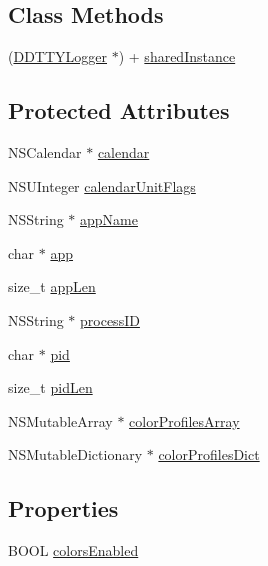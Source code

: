 \subsection*{Class Methods}
\begin{DoxyCompactItemize}
\item 
(\hyperlink{interface_d_d_t_t_y_logger}{D\-D\-T\-T\-Y\-Logger} $\ast$) + \hyperlink{interface_d_d_t_t_y_logger_abcb0224cccf6a4515ae22f1c79c0c9d5}{shared\-Instance}
\end{DoxyCompactItemize}
\subsection*{Protected Attributes}
\begin{DoxyCompactItemize}
\item 
N\-S\-Calendar $\ast$ \hyperlink{interface_d_d_t_t_y_logger_a4ee6e8d3042ae5d175a768a4e5c53c09}{calendar}
\item 
N\-S\-U\-Integer \hyperlink{interface_d_d_t_t_y_logger_a056843aff6a644ca5cec90806bccd3b4}{calendar\-Unit\-Flags}
\item 
N\-S\-String $\ast$ \hyperlink{interface_d_d_t_t_y_logger_a9f54836505cd04fe3205fc4b0419fd4d}{app\-Name}
\item 
char $\ast$ \hyperlink{interface_d_d_t_t_y_logger_aea8969e6e0fc04b775c1212139c669ea}{app}
\item 
size\-\_\-t \hyperlink{interface_d_d_t_t_y_logger_a1f9410c4ec61277fb56f5a85c57a4474}{app\-Len}
\item 
N\-S\-String $\ast$ \hyperlink{interface_d_d_t_t_y_logger_a43d53c81250bb1910fec950b80f2ade1}{process\-I\-D}
\item 
char $\ast$ \hyperlink{interface_d_d_t_t_y_logger_af2d379faf865a0459888f1fe9174df68}{pid}
\item 
size\-\_\-t \hyperlink{interface_d_d_t_t_y_logger_a7585c0c145ea2043d0048339afae9e2a}{pid\-Len}
\item 
N\-S\-Mutable\-Array $\ast$ \hyperlink{interface_d_d_t_t_y_logger_a1168b3a024ac486de6f278e1dc7e0702}{color\-Profiles\-Array}
\item 
N\-S\-Mutable\-Dictionary $\ast$ \hyperlink{interface_d_d_t_t_y_logger_ad3534f05cc5b4e630276bc38626a8e63}{color\-Profiles\-Dict}
\end{DoxyCompactItemize}
\subsection*{Properties}
\begin{DoxyCompactItemize}
\item 
B\-O\-O\-L \hyperlink{interface_d_d_t_t_y_logger_a4d0b3f3f5bb3b8d220568b7e8b1fb9d8}{colors\-Enabled}
\end{DoxyCompactItemize}


